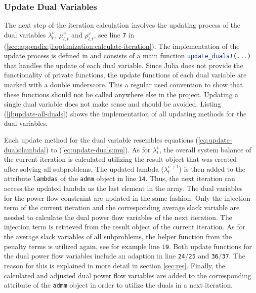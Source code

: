 \subsubsection*{Update Dual Variables}

The next step of the iteration calculation involves the updating process of the dual variables $\lambda_{t}^v$, $\mu_{l,t}^v$ and $\rho_{l,t}^v$, see line \texttt{7} in (\ref{sec:appendix:jl:optimization:calculate-iteration}). The implementation of the update process is defined in  and consists of a main function \lstinline[language=julia]{update_duals!(...)} that handles the update of each dual variable. Since Julia does not provide the functionality of private functions, the update functions of each dual variable are marked with a double underscore. This a regular used convention to show that these functions should not be called anywhere else in the project. Updating a single dual variable does not make sense and should be avoided. Listing (\ref{jl:update-all-duals}) shows the implementation of all updating methods for the dual variables.



Each update method for the dual variable resembles equations (\ref{eq:update-duals:lambda}) to (\ref{eq:update-duals:mu}). As for $\lambda_{t}^v$, the overall system balance of the current iteration is calculated utilizing the result object that was created after solving all subproblems. The updated lambda ($\lambda_{t}^{v+1}$) is then added to the attribute \lstinline[language=julia]{lambdas} of the \lstinline[language=julia]{admm} object in line \texttt{14}. Thus, the next iteration can access the updated lambda as the last element in the array. The dual variables for the power flow constraint are updated in the same fashion. Only the injection term of the current iteration and the corresponding average slack variable are needed to calculate the dual power flow variables of the next iteration. The injection term is retrieved from the result object of the current iteration. As for the average slack variables of all subproblems, the helper function from the penalty terms is utilized again, see for example line \texttt{19}. Both update functions for the dual power flow variables include an adaption in line \texttt{24}/\texttt{25} and \texttt{36}/\texttt{37}. The reason for this is explained in more detail in section \ref{sec:res}. Finally, the calculated and adjusted dual power flow variables are added to the corresponding attribute of the \lstinline[language=julia]{admm} object in order to utilize the duals in a next iteration.

